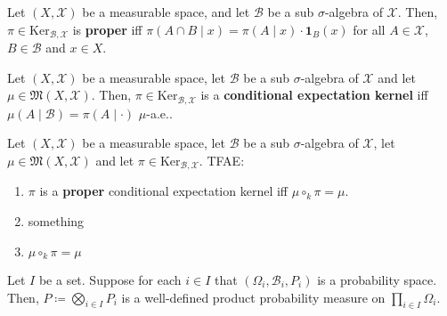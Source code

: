 \begin{definition}
    \label{def:proper-kernel}
    \leanok

    Let $(X,\mathcal{X})$ be a measurable space, and let $\mathcal{B}$ be a sub $\sigma$-algebra of $\mathcal{X}$. Then, $\pi\in\text{Ker}_{\mathcal{B},\mathcal{X}}$ is \textbf{proper} iff $\pi(A\cap B\mid x)=\pi(A\mid x)\cdot\mathbf{1}_B(x)$ for all $A\in\mathcal{X}$, $B\in\mathcal{B}$ and $x\in X$.
\end{definition}

\begin{definition}
    \label{def:cond-exp-kernel}
    \leanok

    Let $(X,\mathcal{X})$ be a measurable space, let $\mathcal{B}$ be a sub $\sigma$-algebra of $\mathcal{X}$ and let $\mu\in\mathfrak{M}(X,\mathcal{X})$. Then, $\pi\in\text{Ker}_{\mathcal{B},\mathcal{X}}$ is a \textbf{conditional expectation kernel} iff $\mu(A\mid \mathcal{B})=\pi(A\mid\cdot)$ $\mu$-a.e..
\end{definition}



\begin{lemma}
    \label{lemma:cond-exp-ker-char}
    \leanok

    Let $(X,\mathcal{X})$ be a measurable space, let $\mathcal{B}$ be a sub $\sigma$-algebra of $\mathcal{X}$, let $\mu\in\mathfrak{M}(X,\mathcal{X})$ and let $\pi\in\text{Ker}_{\mathcal{B},\mathcal{X}}$. TFAE:
    \begin{enumerate}
        \item $\pi$ is a \textbf{proper} conditional expectation kernel iff $\mu\circ_k \pi=\mu$.
        \item something
        \item $\mu\circ_k \pi=\mu$
    \end{enumerate}
\end{lemma}


\begin{definition}
    \label{def:product-probability-measure}
    \leanok

    Let $I$ be a set. Suppose for each $i\in I$ that $(\Omega_i,\mathcal{B}_i,P_i)$ is a probability space. Then, $P\coloneqq\bigotimes_{i\in I}P_i$ is a well-defined product probability measure on $\prod_{i\in I}\Omega_i$.
\end{definition}

